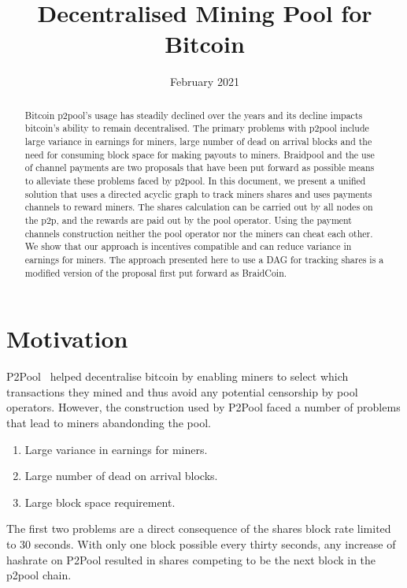 \documentclass{article}
\title{Decentralised Mining Pool for Bitcoin}
\date{February 2021}
\begin{document}
\maketitle

\begin{abstract}
  Bitcoin p2pool's usage has steadily declined over the years and its
  decline impacts bitcoin's ability to remain decentralised. The
  primary problems with p2pool include large variance in earnings for
  miners, large number of dead on arrival blocks and the need for
  consuming block space for making payouts to miners.  Braidpool and
  the use of channel payments are two proposals that have been put
  forward as possible means to alleviate these problems faced by
  p2pool. In this document, we present a unified solution that uses a
  directed acyclic graph to track miners shares and uses payments
  channels to reward miners. The shares calculation can be carried out
  by all nodes on the p2p, and the rewards are paid out by the pool
  operator. Using the payment channels construction neither the pool
  operator nor the miners can cheat each other. We show that our
  approach is incentives compatible and can reduce variance in
  earnings for miners. The approach presented here to use a DAG for
  tracking shares is a modified version of the proposal first put
  forward as BraidCoin.
\end{abstract}
   
\section{Motivation}

P2Pool~\cite{p2pool:wiki} helped decentralise bitcoin by enabling
miners to select which transactions they mined and thus avoid any
potential censorship by pool operators. However, the construction used
by P2Pool faced a number of problems that lead to miners abandonding
the pool.

\begin{enumerate}
  \item Large variance in earnings for miners.
  \item Large number of dead on arrival blocks.
  \item Large block space requirement.
\end{enumerate}

The first two problems are a direct consequence of the shares block
rate limited to 30 seconds. With only one block possible every thirty
seconds, any increase of hashrate on P2Pool resulted in shares
competing to be the next block in the p2pool chain.
\end{document}
